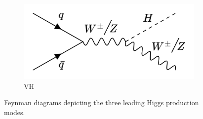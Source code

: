 \begin{figure}[htp]
     \hfill 
     \\
        \begin{subfigure}[b]{0.3\textwidth}
         \centering
         \includegraphics[width=\textwidth]{figures/theory_chapter/VH.png}
         \caption{VH}
         \label{fig:VH}
     \end{subfigure}
  \label{fig:Higgsmodes}
  \caption{Feynman diagrams depicting the three leading Higgs production modes.}  
\end{figure}

